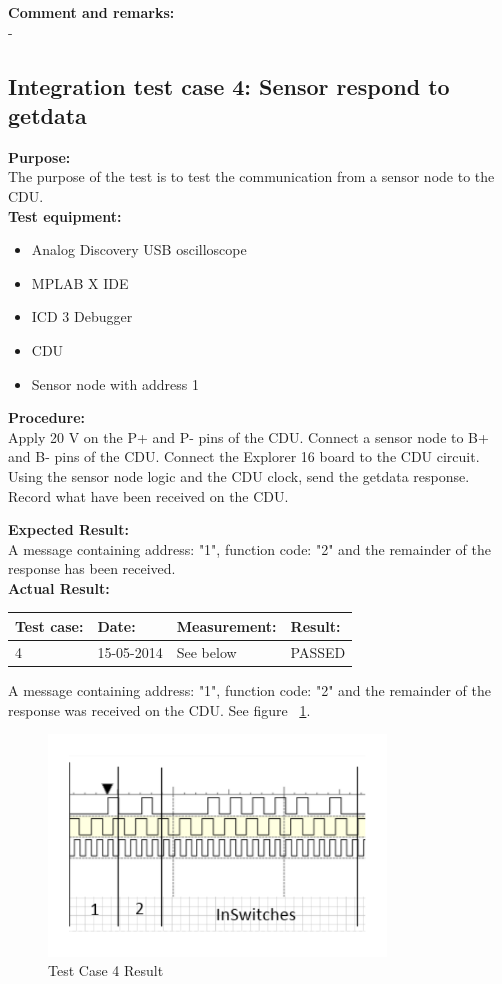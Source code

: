 \textbf{Comment and remarks:}\\
-\\

\subsection{Integration test case 4: Sensor respond to getdata}
\textbf{Purpose:}\\
The purpose of the test is to test the communication from a sensor node to the CDU.\\

\textbf{Test equipment:}
\begin{itemize}
\item Analog Discovery USB oscilloscope
\item MPLAB X IDE
\item ICD 3 Debugger
\item CDU
\item Sensor node with address 1
\end{itemize}

\textbf{Procedure:}\\
Apply 20 V on the P+ and P- pins of the CDU. Connect a sensor node to B+ and B- pins of the CDU. Connect the Explorer 16 board to the CDU circuit. Using the sensor node logic and the CDU clock, send the getdata response. Record what have been received on the CDU.

\textbf{Expected Result:}\\
A message containing address: "1", function code: "2" and the remainder of the response has been received.\\

\textbf{Actual Result:}\\
\begin{table}[H]
\centering
\begin{tabular}{|p{2cm}|p{2cm}|p{3cm}|p{2cm}|}\hline
\textbf{Test case:} & \textbf{Date:} & \textbf{Measurement:} & \textbf{Result:} \\ \hline
4 & 15-05-2014 & See below & PASSED \\ \hline
\end{tabular}
\end{table}
A message containing address: "1", function code: "2" and the remainder of the response was received on the CDU. See figure ~\ref{fig:InteTestCase4}.
\begin{figure}[H]
\centering
\includegraphics[width=0.8\textwidth]{billeder/intetestcase4}
\caption{Test Case 4 Result}
\label{fig:InteTestCase4}
\end{figure}


